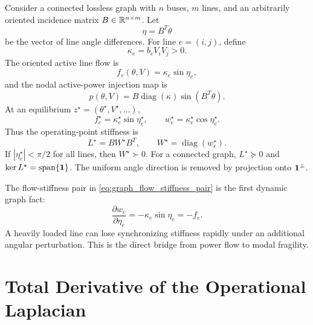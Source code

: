 Consider a connected lossless graph with \(n\) buses, \(m\) lines, and an
arbitrarily oriented incidence matrix \(B\in\mathbb{R}^{n\times m}\). Let
\begin{equation}
  \eta=B^T\theta
  \label{eq:graph_eta}
\end{equation}
be the vector of line angle differences. For line \(e=(i,j)\), define
\begin{equation}
  \kappa_e=b_eV_iV_j>0.
  \label{eq:graph_kappa}
\end{equation}
The oriented active line flow is
\begin{equation}
  f_e(\theta,V)=\kappa_e\sin\eta_e,
  \label{eq:graph_line_flow}
\end{equation}
and the nodal active-power injection map is
\begin{equation}
  p(\theta,V)=B\operatorname{diag}(\kappa)\sin(B^T\theta).
  \label{eq:graph_power_flow_compact}
\end{equation}
At an equilibrium \(z^\star=(\theta^\star,V^\star,\ldots)\),
\begin{equation}
  f_e^\star=\kappa_e^\star\sin\eta_e^\star,
  \qquad
  w_e^\star=\kappa_e^\star\cos\eta_e^\star.
  \label{eq:graph_flow_stiffness_pair}
\end{equation}
Thus the operating-point stiffness is
\begin{equation}
  L^\star=B W^\star B^T,\qquad
  W^\star=\operatorname{diag}(w_e^\star).
  \label{eq:graph_operational_laplacian}
\end{equation}
If \(|\eta_e^\star|<\pi/2\) for all lines, then \(W^\star\succ0\). For a
connected graph, \(L^\star\succeq0\) and
\(\ker L^\star=\operatorname{span}\{\mathbf 1\}\). The uniform angle direction is
removed by projection onto \(\mathbf 1^\perp\).

The flow-stiffness pair in \eqref{eq:graph_flow_stiffness_pair} is the first
dynamic graph fact:
\begin{equation}
  \frac{\partial w_e}{\partial \eta_e}
  =
  -\kappa_e\sin\eta_e
  =
  -f_e.
  \label{eq:graph_stiffness_angle_derivative}
\end{equation}
A heavily loaded line can lose synchronizing stiffness rapidly under an
additional angular perturbation. This is the direct bridge from power flow to
modal fragility.

\section{Total Derivative of the Operational Laplacian}

